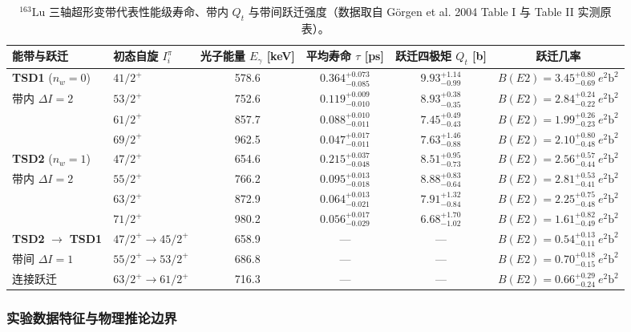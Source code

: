 \begin{table}[!htbp]
\centering
\small
\caption{$^{163}\mathrm{Lu}$ 三轴超形变带代表性能级寿命、带内 $Q_t$ 与带间跃迁强度（数据取自 Görgen et al. 2004 Table I 与 Table II 实测原表）。}\label{tab:4-4-lu163-sample}
\begin{tabularx}{\textwidth}{llcccc}
\hline\hline
能带与跃迁 & 初态自旋 $I_i^\pi$ & 光子能量 $E_\gamma$ [keV] & 平均寿命 $\tau$ [ps] & 跃迁四极矩 $Q_t$ [b] & 跃迁几率 \\
\hline
\textbf{TSD1} ($n_w=0$) & $41/2^+$ & 578.6 & $0.364_{-0.085}^{+0.073}$ & $9.93_{-0.99}^{+1.14}$ & $B(E2) = 3.45_{-0.69}^{+0.80}\ e^2\mathrm{b}^2$ \\
带内 $\Delta I = 2$ & $53/2^+$ & 752.6 & $0.119_{-0.010}^{+0.009}$ & $8.93_{-0.35}^{+0.38}$ & $B(E2) = 2.84_{-0.22}^{+0.24}\ e^2\mathrm{b}^2$ \\
& $61/2^+$ & 857.7 & $0.088_{-0.011}^{+0.010}$ & $7.45_{-0.43}^{+0.49}$ & $B(E2) = 1.99_{-0.23}^{+0.26}\ e^2\mathrm{b}^2$ \\
& $69/2^+$ & 962.5 & $0.047_{-0.011}^{+0.017}$ & $7.63_{-0.88}^{+1.46}$ & $B(E2) = 2.10_{-0.48}^{+0.80}\ e^2\mathrm{b}^2$ \\
\hline
\textbf{TSD2} ($n_w=1$) & $47/2^+$ & 654.6 & $0.215_{-0.048}^{+0.037}$ & $8.51_{-0.73}^{+0.95}$ & $B(E2) = 2.56_{-0.44}^{+0.57}\ e^2\mathrm{b}^2$ \\
带内 $\Delta I = 2$ & $55/2^+$ & 766.2 & $0.095_{-0.018}^{+0.013}$ & $8.88_{-0.64}^{+0.83}$ & $B(E2) = 2.81_{-0.41}^{+0.53}\ e^2\mathrm{b}^2$ \\
& $63/2^+$ & 872.9 & $0.064_{-0.021}^{+0.013}$ & $7.91_{-0.84}^{+1.32}$ & $B(E2) = 2.25_{-0.48}^{+0.75}\ e^2\mathrm{b}^2$ \\
& $71/2^+$ & 980.2 & $0.056_{-0.029}^{+0.017}$ & $6.68_{-1.02}^{+1.70}$ & $B(E2) = 1.61_{-0.49}^{+0.82}\ e^2\mathrm{b}^2$ \\
\hline
\textbf{TSD2} $\to$ \textbf{TSD1} & $47/2^+ \to 45/2^+$ & 658.9 & — & — & $B(E2) = 0.54_{-0.11}^{+0.13}\ e^2\mathrm{b}^2$ \\
带间 $\Delta I = 1$ & $55/2^+ \to 53/2^+$ & 686.8 & — & — & $B(E2) = 0.70_{-0.15}^{+0.18}\ e^2\mathrm{b}^2$ \\
连接跃迁 & $63/2^+ \to 61/2^+$ & 716.3 & — & — & $B(E2) = 0.66_{-0.24}^{+0.29}\ e^2\mathrm{b}^2$ \\
\hline\hline
\end{tabularx}
\end{table}

\subsubsection{实验数据特征与物理推论边界}

